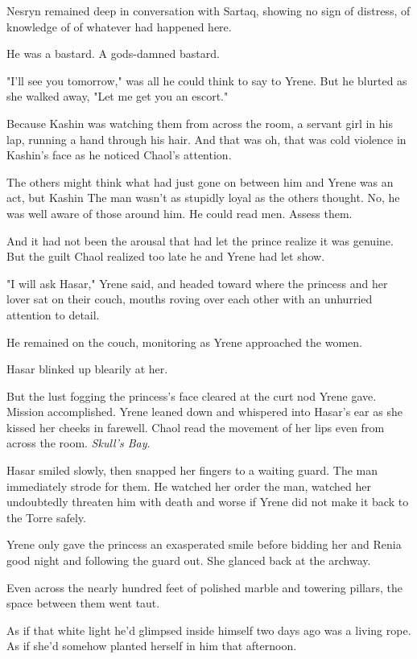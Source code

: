 Nesryn remained deep in conversation with Sartaq, showing no sign of distress, of knowledge of  of whatever had happened here.

He was a bastard. A gods-damned bastard.

"I'll see you tomorrow," was all he could think to say to Yrene. But he blurted as she walked away, "Let me get you an escort."

Because Kashin was watching them from across the room, a servant girl in his lap, running a hand through his hair. And that was  oh, that was cold violence in Kashin's face as he noticed Chaol's attention.

The others might think what had just gone on between him and Yrene was an act, but Kashin  The man wasn't as stupidly loyal as the others thought. No, he was well aware of those around him. He could read men. Assess them.

And it had not been the arousal that had let the prince realize it was genuine. But the guilt Chaol realized too late he and Yrene had let show.

"I will ask Hasar," Yrene said, and headed toward where the princess and her lover sat on their couch, mouths roving over each other with an unhurried attention to detail.

He remained on the couch, monitoring as Yrene approached the women.

Hasar blinked up blearily at her.

But the lust fogging the princess's face cleared at the curt nod Yrene gave. Mission accomplished. Yrene leaned down and whispered into Hasar's ear as she kissed her cheeks in farewell. Chaol read the movement of her lips even from across the room. \emph{Skull's Bay}.

Hasar smiled slowly, then snapped her fingers to a waiting guard. The man immediately strode for them. He watched her order the man, watched her undoubtedly threaten him with death and worse if Yrene did not make it back to the Torre safely.

Yrene only gave the princess an exasperated smile before bidding her and Renia good night and following the guard out. She glanced back at the archway.

Even across the nearly hundred feet of polished marble and towering pillars, the space between them went taut.

As if that white light he'd glimpsed inside himself two days ago was a living rope. As if she'd somehow planted herself in him that afternoon.

